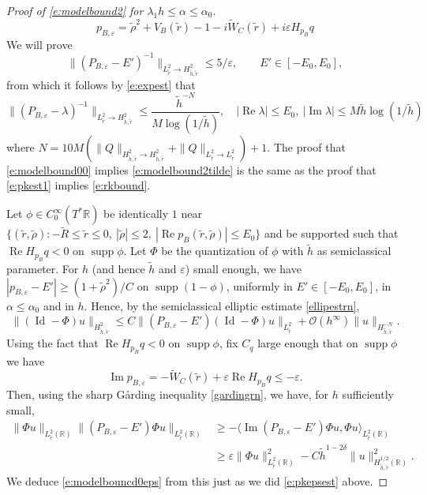 \documentclass[reqno, 12pt]{amsart}
\newcommand \R {\mathbb{R}}
\newcommand \Oh {\mathcal{O}}
\newcommand \la {\langle}
\newcommand \ra {\rangle}
\newcommand \eps {\varepsilon}
\DeclareMathOperator \re {Re}
\DeclareMathOperator \im {Im}
\DeclareMathOperator \supp {supp}
\DeclareMathOperator \Id {Id}
\theoremstyle{definition}
\numberwithin{equation}{section}
\numberwithin{prop}{section}
\numberwithin{figure}{section}
\begin{document}
\begin{proof}[Proof of \eqref{e:modelbound2} for $\lambda_1 h \le \alpha \le \alpha_0$]
\[
p_{B,\eps} = \tilde \rho^2 + V_B(\tilde r) - 1 - i \widetilde W_C(\tilde r) + i \eps H_{p_B} q
\]
We will prove
\begin{equation}\label{e:modelbouncd0eps}
\|(P_{B,\eps} -E')^{-1}\|_{L^2_{\tilde r} \to H^2_{\tilde h, \tilde r} } \le 5/\eps, \qquad E' \in [-E_0,E_0],
\end{equation}
from which it follows by \eqref{e:expest} that
\begin{equation}\label{e:modelbound00}
\|(P_{B,\eps} -\lambda)^{-1}\|_{L^2_{\tilde r} \to H^2_{\tilde h, \tilde r} }  \le \frac{\tilde h^{-N}}{M\log(1/\tilde h)}, \quad |\re \lambda| \le E_0, \ |\im \lambda| \le M \tilde h \log(1/\tilde h)
\end{equation}
where $N = 10M(\|Q\|_{H^2_{\tilde h, \tilde r} \to H^2_{\tilde h, \tilde r}} + \|Q\|_{L^2_{\tilde r} \to L^2_{\tilde r}}) + 1$. The proof that \eqref{e:modelbound00} implies \eqref{e:modelbound2tilde} is the same as the proof that \eqref{e:pkest1} implies \eqref{e:rkbound}.

Let $\phi \in C_0^\infty(T^*\R)$ be identically $1$ near $\{(\tilde r, \tilde \rho): -\widetilde R \le \tilde r \le 0,\ |\tilde \rho|\le2,\ |\re p_B(\tilde r, \tilde \rho)| \le E_0\}$ and be supported such that $\re H_{p_B}q <0$ on $\supp \phi$. Let $\Phi$ be the quantization of $\phi$ with $\tilde h$ as semiclassical parameter. For $h$ (and hence $\tilde h$ and $\eps$) small enough,  we have $|p_{B,\eps} - E'| \ge (1 + \tilde \rho^2)/C$ on $\supp (1-\phi)$, uniformly in $E' \in [-E_0,E_0]$, in $\alpha \le \alpha_0$ and in $h$. Hence, by the semiclassical elliptic estimate \eqref{ellipestrn},
\[
\|(\Id - \Phi) u\|_{H^2_{\tilde h, \tilde r}} \le C \|(P_{B,\eps} - E')(\Id - \Phi) u\|_{L^2_{\tilde r}} + \Oh(h^\infty)\|u\|_{H^{-N}_{\tilde h, \tilde r}}.
\]
Using the fact that $\re H_{p_B}q <0$ on $\supp\phi$, fix $C_q$ large enough that on $\supp\phi$  we have
\[
\im p_{B,\eps} = -  \widetilde W_C(\tilde r) + \eps \re H_{p_B} q \le - \eps.
\]
Then, using the sharp G\aa rding inequality \eqref{gardingrn}, we have, for $h$ sufficiently small,
\[\begin{split}
\|\Phi u\|_{L^2_{\tilde r}(\R)} \|(P_{B,\eps} - E')\Phi u\|_{L^2_{\tilde r}(\R)} &\ge - \la\im (P_{B,\eps} - E')\Phi u, \Phi u \ra_{L^2_{\tilde r}(\R)}  \\
& \ge \eps \|\Phi u\|_{L^2_{\tilde r}(\R)}^2 - C \tilde h^{1-2\delta} \|u\|^2_{H^{1/2}_{\tilde h, \tilde r}(\R)}.
\end{split}\]
We deduce \eqref{e:modelbouncd0eps} from this just as we did \eqref{e:pkepsest} above.
\end{proof}
\end{document}
